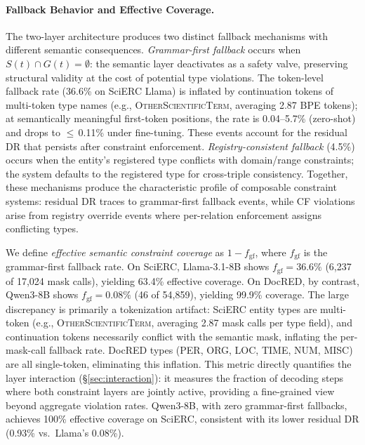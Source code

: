 \paragraph{Fallback Behavior and Effective Coverage.}
\label{app:fallback-coverage}
The two-layer architecture produces two distinct fallback mechanisms with different semantic consequences.
\emph{Grammar-first fallback} occurs when $S(t) \cap G(t) = \emptyset$: the semantic layer deactivates as a safety valve, preserving structural validity at the cost of potential type violations.
The token-level fallback rate (36.6\% on SciERC Llama) is inflated by continuation tokens of multi-token type names (e.g., \textsc{OtherScientificTerm}, averaging 2.87 BPE tokens); at semantically meaningful first-token positions, the rate is 0.04--5.7\% (zero-shot) and drops to $\leq$\,0.11\% under fine-tuning.
These events account for the residual DR that persists after constraint enforcement.
\emph{Registry-consistent fallback} (4.5\%) occurs when the entity's registered type conflicts with domain/range constraints; the system defaults to the registered type for cross-triple consistency.
Together, these mechanisms produce the characteristic profile of composable constraint systems: residual DR traces to grammar-first fallback events, while CF violations arise from registry override events where per-relation enforcement assigns conflicting types.

We define \emph{effective semantic constraint coverage} as $1 - f_{\text{gf}}$, where $f_{\text{gf}}$ is the grammar-first fallback rate.
On SciERC, Llama-3.1-8B shows $f_{\text{gf}} = 36.6\%$ (6{,}237 of 17{,}024 mask calls), yielding 63.4\% effective coverage.
On DocRED, by contrast, Qwen3-8B shows $f_{\text{gf}} = 0.08\%$ (46 of 54{,}859), yielding 99.9\% coverage.
The large discrepancy is primarily a tokenization artifact: SciERC entity types are multi-token (e.g., \textsc{OtherScientificTerm}, averaging 2.87 mask calls per type field), and continuation tokens necessarily conflict with the semantic mask, inflating the per-mask-call fallback rate.
DocRED types (\textsc{PER}, \textsc{ORG}, \textsc{LOC}, \textsc{TIME}, \textsc{NUM}, \textsc{MISC}) are all single-token, eliminating this inflation.
This metric directly quantifies the layer interaction (\S\ref{sec:interaction}): it measures the fraction of decoding steps where both constraint layers are jointly active, providing a fine-grained view beyond aggregate violation rates.
Qwen3-8B, with zero grammar-first fallbacks, achieves 100\% effective coverage on SciERC, consistent with its lower residual DR (0.93\% vs.\ Llama's 0.08\%).

